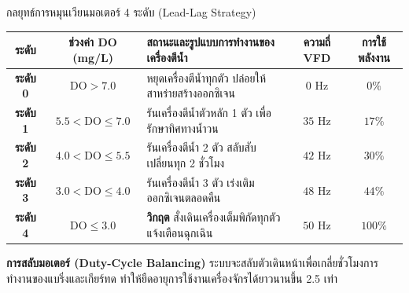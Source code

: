 \documentclass[aspectratio=169, 10pt]{beamer}
\begin{document}
\begin{frame}{กลยุทธ์การหมุนเวียนมอเตอร์ 4 ระดับ (Lead-Lag Strategy)}
\begin{center}
{\scriptsize
\begin{tabularx}{\textwidth}{ccXcc}
\toprule
\textbf{\color{rbruNavy} ระดับ} & \textbf{\color{rbruNavy} ช่วงค่า DO (mg/L)} & \textbf{\color{rbruNavy} สถานะและรูปแบบการทำงานของเครื่องตีน้ำ} & \textbf{\color{rbruNavy} ความถี่ VFD} & \textbf{\color{rbruNavy} การใช้พลังงาน} \\
\midrule
\textbf{ระดับ 0} & $\text{DO} > 7.0$ & หยุดเครื่องตีน้ำทุกตัว ปล่อยให้สาหร่ายสร้างออกซิเจน & $0\text{ Hz}$ & $0\%$ \\
\textbf{ระดับ 1} & $5.5 < \text{DO} \le 7.0$ & รันเครื่องตีน้ำตัวหลัก 1 ตัว เพื่อรักษาทิศทางน้ำวน & $35\text{ Hz}$ & $17\%$ \\
\textbf{ระดับ 2} & $4.0 < \text{DO} \le 5.5$ & รันเครื่องตีน้ำ 2 ตัว สลับสับเปลี่ยนทุก 2 ชั่วโมง & $42\text{ Hz}$ & $30\%$ \\
\textbf{ระดับ 3} & $3.0 < \text{DO} \le 4.0$ & รันเครื่องตีน้ำ 3 ตัว เร่งเติมออกซิเจนตลอดคืน & $48\text{ Hz}$ & $44\%$ \\
\textbf{ระดับ 4} & $\text{DO} \le 3.0$ & \textbf{วิกฤต} สั่งเดินเครื่องเต็มพิกัดทุกตัว แจ้งเตือนฉุกเฉิน & $50\text{ Hz}$ & $100\%$ \\
\bottomrule
\end{tabularx}
}
\end{center}

\vspace{0.05cm}
\begin{notecard}
    {\bfseries\color{agriForest} การสลับมอเตอร์ (Duty-Cycle Balancing)} ระบบจะสลับตัวเดินหน้าเพื่อเกลี่ยชั่วโมงการทำงานของแบริ่งและเกียร์ทด ทำให้ยืดอายุการใช้งานเครื่องจักรได้ยาวนานขึ้น 2.5 เท่า
\end{notecard}
\end{frame}
\end{document}
